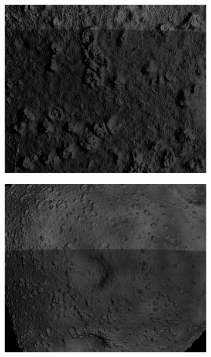 \begin{figure}[htb]
    \centering
    \begin{subfigure}[b]{0.32\textwidth}
        \centering
        \includegraphics[width=\textwidth]{doc/thesis/0_figures/rendering_artefacts/50_10_SssbOnly_2017-08-15T115845-190000.jpg}
        \caption{}
        \label{fig:render_artefacts_50}
    \end{subfigure}
    \begin{subfigure}[b]{0.32\textwidth}
        \centering
        \includegraphics[width=\textwidth]{doc/thesis/0_figures/rendering_artefacts/200_10_SssbOnly_2017-08-15T115845-190000.jpg}

\end{subfigure}
\end{figure}
